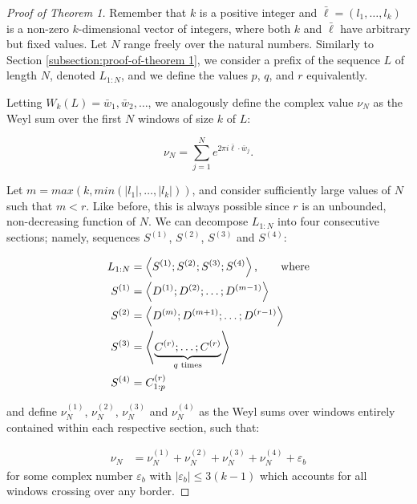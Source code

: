 \documentclass[11pt,a4paper]{tesis}
\theoremstyle{plain}
\theoremstyle{definition}
\begin{document}
\begin{proof}[Proof of Theorem 1]

  Remember that $k$ is a positive integer and $\bar{\ell} = (l_1, \dots, l_k)$ is a non-zero $k$-dimensional vector of integers, where both $k$ and $\bar{\ell}$ have arbitrary but fixed values. Let $N$ range freely over the natural numbers. Similarly to Section \ref{subsection:proof-of-theorem 1}, we consider a prefix of the sequence $L$ of length $N$, denoted $L_{1:N}$, and we define the values $p$, $q$, and $r$ equivalently.

  Letting $W_k(L) = \bar{w}_1, \bar{w}_2, \dots$, we analogously define the complex value $\nu_N$ as the Weyl sum over the first $N$ windows of size $k$ of $L$:

  \begin{equation*}
    \nu_N = \sum_{j = 1}^{N} e^{2 \pi i \bar{\ell} \cdot \bar{w}_j} \text{.}
  \end{equation*}

  Let $m = max\left(k, min\left(|l_1|, \dots, |l_k|\right)\right)$, and consider sufficiently large values of $N$ such that $m < r$. Like before, this is always possible since $r$ is an unbounded, non-decreasing function of $N$. We can decompose $L_{1:N}$ into four consecutive sections; namely, sequences $S^{(1)}$, $S^{(2)}$, $S^{(3)}$ and $S^{(4)}$:

  \begin{equation*}
    \begin{aligned}
      L_{1:N} & = \left< S^{(1)} ; S^{(2)} ; S^{(3)} ; S^{(4)} \right> \text{, \hspace*{5mm} where} \\
      S^{(1)} & = \left< D^{(1)} ; D^{(2)} ; \dots ; D^{(m - 1)} \right> \\
      S^{(2)} & = \left< D^{(m)} ; D^{(m + 1)} ; \dots ; D^{(r - 1)} \right> \\
      S^{(3)} & = \left< \underbrace{C^{(r)} ; \dots ; C^{(r)}}_{q \text{ times}} \right> \\ 
      S^{(4)} & = C^{(r)}_{1:p}
    \end{aligned}
  \end{equation*}

  and define $\nu_N^{(1)}$, $\nu_N^{(2)}$, $\nu_N^{(3)}$ and $\nu_N^{(4)}$ as the Weyl sums over windows entirely contained within each respective section, such that:

  \begin{equation*}
    \begin{aligned}
      \nu_N & = \nu^{(1)}_N + \nu^{(2)}_N + \nu^{(3)}_N + \nu^{(4)}_N + \varepsilon_b
    \end{aligned}
  \end{equation*}
  for some complex number $\varepsilon_b$ with $|\varepsilon_b| \le 3 (k - 1)$ which accounts for all windows crossing over any border.


\end{proof}
\end{document}

